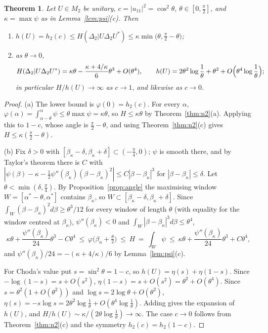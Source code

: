 \documentclass[11pt]{article}
\theoremstyle{plain}
\newtheorem{theorem}{Theorem}[section]
\theoremstyle{definition}
\theoremstyle{remark}
\begin{document}
\begin{theorem}\label{thm:bound}
Let $U\in M_2$ be unitary, $c=|u_{11}|^2=\cos^2\theta$, $\theta\in[0,\frac\pi2]$, and $\kappa=\max\psi$ as in
Lemma~\ref{lem:psi}(c). Then
\begin{enumerate}
\item[(a)] $h(U)=h_2(c)\le H(\Delta_2|U\Delta_2U^*)\le\kappa\min\bigl(\theta,\frac\pi2-\theta\bigr)$;
\item[(b)] as $\theta\to0$,
\[
  H(\Delta_2|U\Delta_2U^*)=\kappa\theta-\frac{\kappa+4/\kappa}6\theta^3+O(\theta^4),\qquad
  h(U)=2\theta^2\log\frac1\theta+\theta^2+O\Bigl(\theta^4\log\frac1\theta\Bigr);
\]
in particular $H/h(U)\to\infty$ as $c\to1$, and likewise as $c\to0$.
\end{enumerate}
\end{theorem}
\begin{proof}
(a) The lower bound is $\varphi(0)=h_2(c)$. For every $\alpha$, $\varphi(\alpha)=\int_{\alpha-\theta}^\alpha\psi\le\theta\max\psi=\kappa\theta$, so
$H\le\kappa\theta$ by Theorem~\ref{thm:n2}(a). Applying this to $1-c$, whose angle is $\frac\pi2-\theta$, and using
Theorem~\ref{thm:n2}(c) gives $H\le\kappa(\frac\pi2-\theta)$.

(b) Fix $\delta>0$ with $[\beta_\kappa-\delta,\beta_\kappa+\delta]\subset(-\frac\pi4,0)$; $\psi$ is smooth there, and by Taylor's theorem
there is $C$ with $|\psi(\beta)-\kappa-\frac12\psi''(\beta_\kappa)(\beta-\beta_\kappa)^2|\le C|\beta-\beta_\kappa|^3$ for
$|\beta-\beta_\kappa|\le\delta$. Let $\theta<\min(\delta,\frac\pi4)$. By Proposition~\ref{prop:angle} the maximising window
$W=[\alpha^*-\theta,\alpha^*]$ contains $\beta_\kappa$, so $W\subset[\beta_\kappa-\delta,\beta_\kappa+\delta]$. Since
$\int_W(\beta-\beta_\kappa)^2d\beta\ge\theta^3/12$ for every window of length $\theta$ (with equality for the window centred at
$\beta_\kappa$), $\psi''(\beta_\kappa)<0$ and $\int_W|\beta-\beta_\kappa|^3d\beta\le\theta^4$,
\[
  \kappa\theta+\frac{\psi''(\beta_\kappa)}{24}\theta^3-C\theta^4\ \le\ \varphi\bigl(\beta_\kappa+\tfrac\theta2\bigr)\ \le\ H\ =\ \int_W\psi\ \le\
  \kappa\theta+\frac{\psi''(\beta_\kappa)}{24}\theta^3+C\theta^4 ,
\]
and $\psi''(\beta_\kappa)/24=-(\kappa+4/\kappa)/6$ by Lemma~\ref{lem:psi}(c).

For Choda's value put $s=\sin^2\theta=1-c$, so $h(U)=\eta(s)+\eta(1-s)$. Since $-\log(1-s)=s+O(s^2)$, $\eta(1-s)=s+O(s^2)=\theta^2+O(\theta^4)$.
Since $s=\theta^2(1+O(\theta^2))$ and $\log s=2\log\theta+O(\theta^2)$, $\eta(s)=-s\log s=2\theta^2\log\frac1\theta+O(\theta^4\log\frac1\theta)$.
Adding gives the expansion of $h(U)$, and $H/h(U)\sim\kappa/(2\theta\log\frac1\theta)\to\infty$. The case $c\to0$ follows from
Theorem~\ref{thm:n2}(c) and the symmetry $h_2(c)=h_2(1-c)$.
\end{proof}
\end{document}
